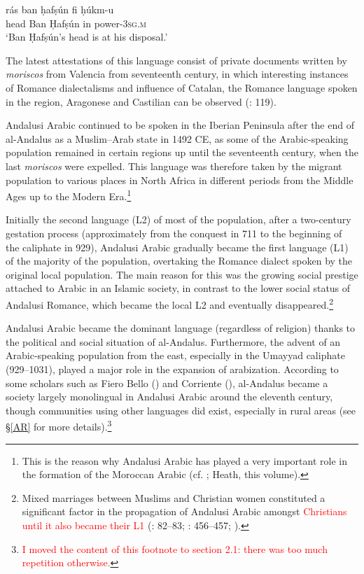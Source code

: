\documentclass[output=paper,modfonts,nonflat]{langsci/langscibook}
\begin{document}
\ex\label{ex:key:}
\gll rás ban ḥafṣún fi ḥúkm-u \\
head Ban Ḥafṣún in power-\textsc{3sg.m}\\
\glt ‘Ban Ḥafṣún’s head is at his disposal.’
\z
\z

The latest attestations of this language consist of private documents written by \textit{moriscos} from Valencia from seventeenth century, in which interesting instances of Romance dialectalisms and influence of Catalan, the Romance language spoken in the region, Aragonese and Castilian can be observed (\citealt{BarcelóLabarta2009}: 119).

Andalusi Arabic continued to be spoken in the Iberian Peninsula after the end of al-Andalus as a Muslim–Arab state in 1492 CE, as some of the Arabic-speaking population remained in certain regions up until the seventeenth century, when the last \textit{moriscos} were expelled. This language was therefore taken by the migrant population to various places in North Africa in different periods from the Middle Ages up to the Modern Era.\footnote{This is the reason why Andalusi Arabic has played a very important role in the formation of the Moroccan Arabic (cf. \citealt{Vicente2010}; Heath, this volume).} 

Initially the second language (L2) of most of the population, after a two-century gestation process (approximately from the conquest in 711 to the beginning of the caliphate in 929), Andalusi Arabic gradually became the first language (L1) of the majority of the population, overtaking the Romance dialect spoken by the original local population. The main reason for this was the growing social prestige attached to Arabic in an Islamic society, in contrast to the lower social status of Andalusi Romance, which became the local L2 and eventually disappeared.\footnote{Mixed marriages between Muslims and Christian women constituted a significant factor in the propagation of Andalusi Arabic amongst \textcolor{red}{Christians until it also became their L1} (\citealt{Guichard1989}: 82–83; \citeyear{Guichard1995}: 456–457; \citealt{Chalmeta2003}).}  

Andalusi Arabic became the dominant language (regardless of religion) thanks to the political and social situation of al-Andalus. Furthermore, the advent of an Arabic-speaking population from the east, especially in the Umayyad caliphate (929--1031), played a major role in the expansion of arabization. According to some scholars such as Fiero Bello (\citeyear{FierroBello2001}) and Corriente (\citeyear[104]{Corriente2008}), al-Andalus became a society largely monolingual in Andalusi Arabic around the eleventh century, though communities using other languages did exist, especially in rural areas (see §\ref{AR} for more details).\footnote{\textcolor{red}{I moved the content of this footnote to section 2.1: there was too much repetition otherwise.}}  
\end{document}

